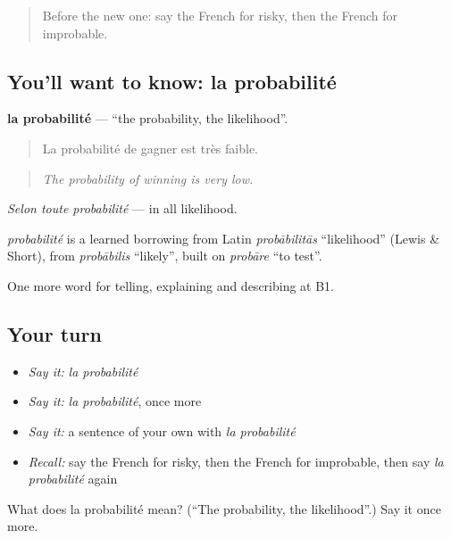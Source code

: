 \begin{quote}
Before the new one: say the French for risky, then the French for improbable.
\end{quote}

\subsection*{You'll want to know: la probabilité}
\textbf{la probabilité} — \textquotedblleft{}the probability, the likelihood\textquotedblright{}.

\begin{quote}
La probabilité de gagner est très faible.
\end{quote}

\begin{quote}
\emph{The probability of winning is very low.}
\end{quote}

\emph{Selon toute probabilité} — in all likelihood.

\begin{cousinweb}
\emph{probabilité} is a learned borrowing from Latin \emph{probābilitās} \textquotedblleft{}likelihood\textquotedblright{} (Lewis \& Short), from \emph{probābilis} \textquotedblleft{}likely\textquotedblright{}, built on \emph{probāre} \textquotedblleft{}to test\textquotedblright{}.
\end{cousinweb}

\begin{grammarlens}[title={What you've built}]
One more word for telling, explaining and describing at B1.
\end{grammarlens}

\subsection*{Your turn}
\begin{itemize}
\raggedright
  \item \emph{Say it:} \emph{la probabilité}
  \item \emph{Say it:} \emph{la probabilité}, once more
  \item \emph{Say it:} a sentence of your own with \emph{la probabilité}
  \item \emph{Recall:} say the French for risky, then the French for improbable, then say \emph{la probabilité} again
\end{itemize}

\begin{tcolorbox}[breakable,colback=teal!4,colframe=teal!35!black,title={Before you move on}]
What does la probabilité mean? (\textquotedblleft{}The probability, the likelihood\textquotedblright{}.) Say it once more.
\end{tcolorbox}
